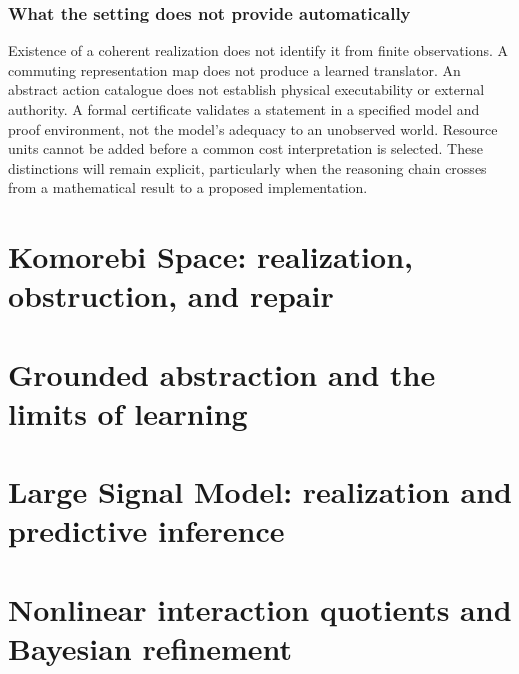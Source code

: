 \documentclass[11pt,oneside,openany]{book}
\numberwithin{equation}{section}
\begin{document}
\section*{What the setting does not provide automatically}
Existence of a coherent realization does not identify it from finite observations. A commuting representation map does not produce a learned translator. An abstract action catalogue does not establish physical executability or external authority. A formal certificate validates a statement in a specified model and proof environment, not the model's adequacy to an unobserved world. Resource units cannot be added before a common cost interpretation is selected. These distinctions will remain explicit, particularly when the reasoning chain crosses from a mathematical result to a proposed implementation.

\renewcommand{\theCoretheorem}{\thechapter.\arabic{Coretheorem}}

\mainmatter

\setcounter{section}{0}

\part{Komorebi Space: realization, obstruction, and repair}
\setcounter{section}{0}

\part{Grounded abstraction and the limits of learning}
\setcounter{section}{0}

\part{Large Signal Model: realization and predictive inference}
\setcounter{section}{0}

\part{Nonlinear interaction quotients and Bayesian refinement}
\setcounter{section}{0}

\end{document}
